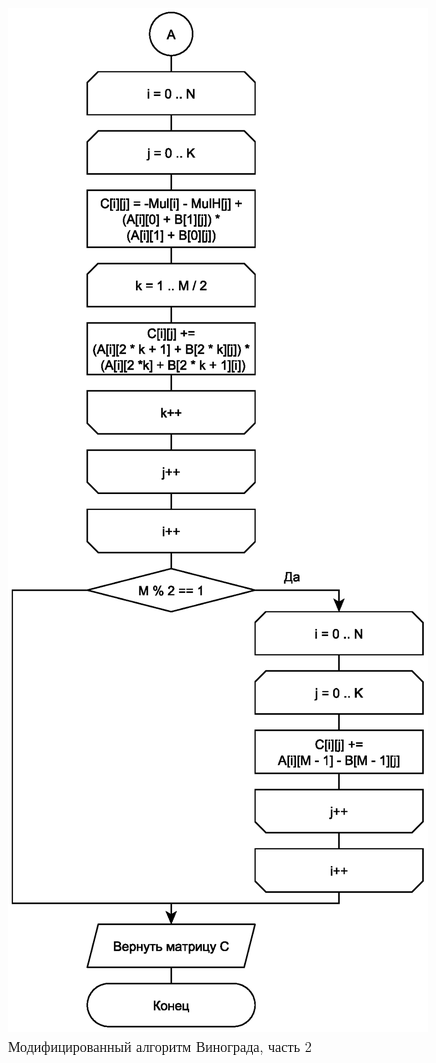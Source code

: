 \begin{figure}[h]
	\centering
	\includegraphics[scale=0.7]{img/vinograd_mod_2.eps}
	\caption{Модифицированный алгоритм Винограда, часть 2}
	\label{fig:mvin2}
\end{figure}

